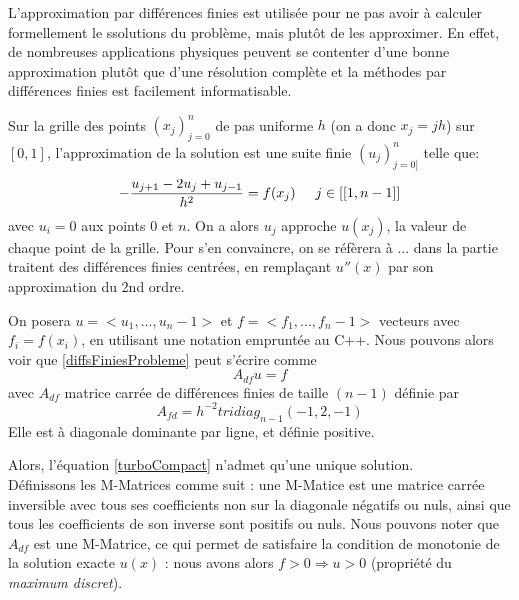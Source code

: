 \documentclass[12pt]{article}
\newcommand{\espace}{\hspace{5mm}}
\begin{document}
L'approximation par différences finies est utilisée pour ne pas avoir à calculer formellement le ssolutions du problème, mais plutôt de les approximer. En effet, de nombreuses applications physiques peuvent se contenter d'une bonne approximation plutôt que d'une résolution complète et la méthodes par différences finies est facilement informatisable.

Sur la grille des points $(x_j)_{j = 0}^n$ de pas uniforme $h$ (on a donc $x_j = jh$) sur $[0,1]$, l'approximation de la solution est une suite finie $(u_j)_{j = 0]}^n$ telle que:
\begin{equation} \label{diffsFiniesProbleme}
	- \frac{u_{j+1} - 2u_j + u_{j-1}}{h^2} = f(x_j) \espace j \in [[1, n-1]]
\end{equation} 
avec $u_i = 0$ aux points $0$ et $n$. On a alors $u_j$ approche $u(x_j)$, la valeur de chaque point de la grille. Pour s'en convaincre, on se réfèrera à ... dans la partie traitent des différences finies centrées, en remplaçant $u''(x)$ par son approximation du 2nd ordre.

On posera $u = <u_1, ..., u_n-1>$ et $f = <f_1, ..., f_n-1>$ vecteurs avec $f_i = f(x_i)$, en utilisant une notation empruntée au C++. Nous pouvons alors voir que \eqref{diffsFiniesProbleme} peut s'écrire comme
\begin{equation} \label{turboCompact}
	A_{df}u = f
\end{equation}
avec $A_{df}$ matrice carrée de différences finies de taille $(n-1)$ définie par
\begin{equation}
	A_{fd} = h^{-2} tridiag_{n-1} (-1, 2, -1)
\end{equation}
Elle est à diagonale dominante par ligne, et définie positive.

Alors, l'équation \eqref{turboCompact} n'admet qu'une unique solution.\\ Définissons les M-Matrices comme suit : une M-Matice est une matrice carrée inversible avec tous ses coefficients non sur la diagonale négatifs ou nuls, ainsi que tous les coefficients de son inverse sont positifs ou nuls.
Nous pouvons noter que $A_{df}$ est une M-Matrice, ce qui permet de satisfaire la condition de monotonie de la solution exacte $u(x)$ : nous avons alors $f >0 \Longrightarrow u>0$ (propriété du \emph{maximum discret}).
\end{document}
